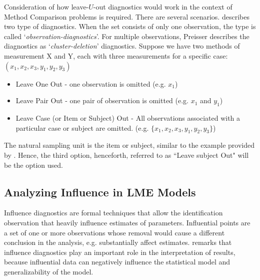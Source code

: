 \documentclass[12pt, a4paper]{report}
\theoremstyle{definition}
\theoremstyle{remark}
\begin{document}
Consideration of how leave-$U$-out diagnostics would work in the context of Method Comparison problems is required. There are several scenarios. \citet{preisser} describes two type of diagnostics. When the set consists of only one observation, the type is called
`\textit{observation-diagnostics}'. For multiple observations, Preisser describes the diagnostics as `\textit{cluster-deletion}' diagnostics. Suppose we have two methods of measurement X and Y, each with three measurements for a specific case: $(x_1,x_2,x_3,y_1,y_2,y_3)$

\begin{itemize}
	\item Leave One Out - one observation is omitted (e.g. $x_1$)
	\item Leave Pair Out - one pair of observation  is omitted (e.g. $x_1$ and $y_1$)
	\item Leave Case (or Item or Subject) Out - All observations associated with a particular case or subject are omitted. (e.g. $\{x_1,x_2,x_3,y_1,y_2,y_3\}$)
\end{itemize}

The natural sampling unit is the item or subject, similar to the example provided by \citet{schabenberger}. Hence, the third option, henceforth, referred to as ``Leave subject Out" will be the option used.



\subsection{Analyzing Influence in LME Models}

Influence diagnostics are formal techniques that allow the identification observation that heavily influence estimates of parameters.
Influential points are a set of one or more observations whose removal would cause a different conclusion in the analysis, e.g. substantially affect estimates. \citet{west} remarks that influence diagnostics play an important role in the interpretation of results, because influential data can negatively influence the statistical model and generalizability of the model.




\end{document}
